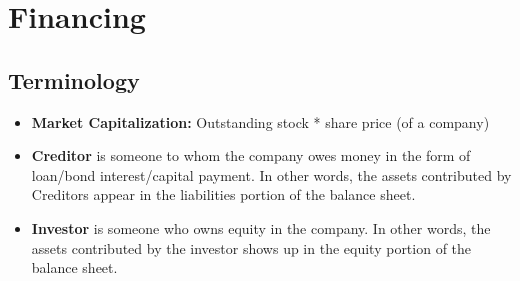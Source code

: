 \chapter{Financing}
\section{Terminology}
	\begin{itemize}
	\item \textbf{Market Capitalization:} Outstanding stock * share price (of a company)
	\item \textbf{Creditor} is someone to whom the company owes money in the form of loan/bond interest/capital payment. In other words, the assets contributed by Creditors appear in the liabilities portion of the balance sheet.
	\item \textbf{Investor} is someone who owns equity in the company.  In other words, the assets contributed by the investor shows up in the equity portion of the balance sheet.
	\end{itemize}
	
